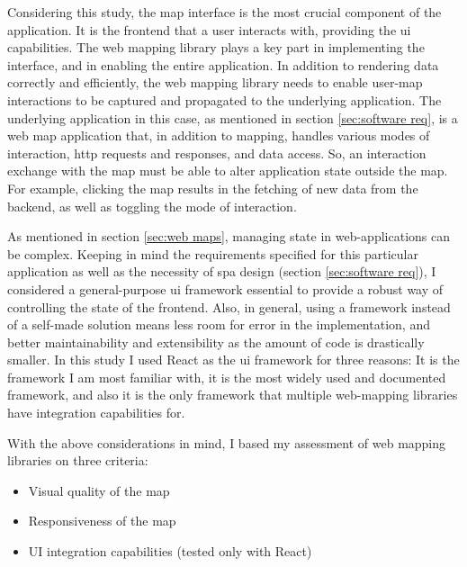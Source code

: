 Considering this study,
the map interface is the most crucial component of the application.
It is the frontend that a user interacts with,
providing the \acrshort{ui} capabilities.
The web mapping library plays a key part in implementing the interface,
and in enabling the entire application.
In addition to rendering data correctly and efficiently,
the web mapping library needs to enable user-map interactions to be
captured and propagated to the underlying application.
The underlying application in this case, as mentioned in
section \ref{sec:software req},
is a web map application
that, in addition to mapping,
handles various modes of interaction,
\acrshort{http} requests and responses, and data access.
So, an interaction exchange with the map
must be able to alter application state outside the map.
For example,
clicking the map results in the fetching of new data from the backend,
as well as toggling the mode of interaction.

As mentioned in section \ref{sec:web maps},
managing state in web-applications can be complex.
Keeping in mind the requirements specified for this particular application
as well as the necessity of \acrshort{spa} design (section \ref{sec:software req}),
I considered a general-purpose \acrshort{ui} framework
essential to provide a robust way of controlling the state of the frontend.
Also, in general, using a framework instead of a self-made solution
means less room for error in the implementation,
and better maintainability and extensibility as the amount of code is drastically smaller.
In this study I used React \parencite{react} as the \acrshort{ui} framework
for three reasons:
It is the framework I am most familiar with,
it is the most widely used and documented framework,
and also it is the only framework that
multiple web-mapping libraries have integration capabilities for.

With the above considerations in mind,
I based my assessment of web mapping libraries on three criteria:
\begin{itemize}
	\item Visual quality of the map
	\item Responsiveness of the map
	\item UI integration capabilities (tested only with React)
\end{itemize}

